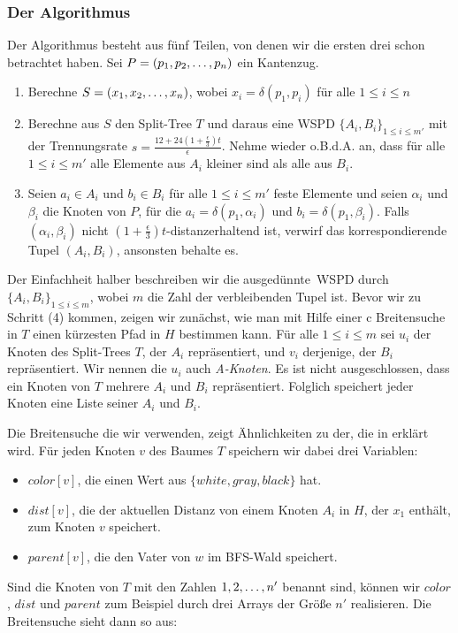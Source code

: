     \subsubsection*{Der Algorithmus}
    Der Algorithmus besteht aus fünf Teilen, von denen wir die ersten drei schon betrachtet haben.
    Sei $P = (p_1, p_2, \mathellipsis, p_n)$ ein Kantenzug.
    \begin{enumerate}
    	\item Berechne $S = (x_1, x_2, \mathellipsis, x_n)$, wobei $x_i = \delta(p_1, p_i)$ für alle $1 \leq i \leq n$
    	\item Berechne aus $S$ den Split-Tree $T$ und daraus eine WSPD $\{A_i, B_i\}_{1 \leq i \leq m'}$ mit der Trennungsrate $s = \frac{12 + 24(1 + \frac{\epsilon}{3})t}{\epsilon}$. Nehme wieder o.B.d.A. an, dass für alle $1 \leq i \leq m'$ alle Elemente aus $A_i$ kleiner sind als alle aus $B_i$.
    	\item Seien $a_i \in A_i$ und $b_i \in B_i$ für alle $1 \leq i \leq m'$ feste Elemente und seien $\alpha_i$ und  $\beta_i$ die Knoten von $P$, für die $a_i = \delta(p_1, \alpha_i)$ und $b_i = \delta(p_1, \beta_i)$. Falls $(\alpha_i, \beta_i)$ nicht $(1+\frac{\epsilon}{3})t$-distanzerhaltend ist, verwirf das korrespondierende Tupel $(A_i, B_i)$, ansonsten behalte es.
    \end{enumerate}
    
    Der Einfachheit halber beschreiben wir die \glqq ausgedünnte\grqq\ WSPD durch $\{A_i, B_i\}_{1\leq i \leq m}$, wobei $m$ die Zahl der verbleibenden Tupel ist.
    Bevor wir zu Schritt (4) kommen, zeigen wir zunächst, wie man mit Hilfe einer c Breitensuche in $T$ einen kürzesten Pfad in $H$ bestimmen kann.  
    Für alle $1 \leq i \leq m$ sei $u_i$ der Knoten des Split-Trees $T$, der $A_i$ repräsentiert, und $v_i$ derjenige, der $B_i$ repräsentiert. Wir nennen die $u_i$ auch \emph{A-Knoten}. Es ist nicht ausgeschlossen, dass ein Knoten von $T$ mehrere $A_i$ und $B_i$ repräsentiert. Folglich speichert jeder Knoten eine Liste seiner $A_i$ und $B_i$.
    
    Die Breitensuche die wir verwenden, zeigt Ähnlichkeiten zu der, die in \cite{hagerup} erklärt wird. Für jeden Knoten $v$ des Baumes $T$ speichern wir dabei drei Variablen:
    \begin{itemize}
    	\item $color[v]$, die einen Wert aus $\{white, gray, black\}$ hat.
    	\item $dist[v]$, die der aktuellen Distanz von einem Knoten $A_i$ in $H$, der $x_1$ enthält, zum Knoten $v$ speichert.
    	\item $parent[v]$, die den Vater von $w$ im BFS-Wald speichert.
    \end{itemize}
    Sind die Knoten von $T$ mit den Zahlen $1, 2,\mathellipsis, n'$ benannt sind, können wir $color$, $dist$ und $parent$ zum Beispiel durch drei Arrays der Größe $n'$ realisieren.
    Die Breitensuche sieht dann so aus:
    
